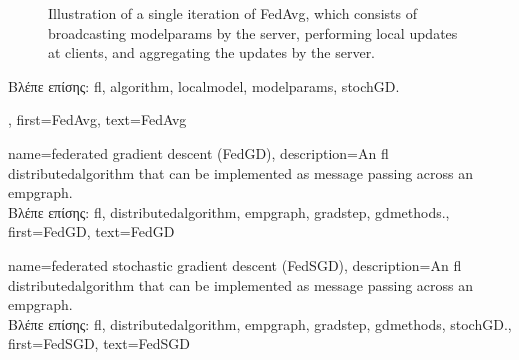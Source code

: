 {{\begin{figure}[H]
\begin{center}
			\end{center}
			\caption{Illustration of a single iteration of FedAvg, which consists of broadcasting \glspl{modelparam} by the 
			server, performing local updates at clients, and aggregating the updates by the server. 
			\label{fig_single_iteration_fedavg_dict}} 
		\end{figure} 
		\foreignlanguage{greek}{Βλέπε επίσης:} \gls{fl}, \gls{algorithm}, \gls{localmodel}, \glspl{modelparam}, \gls{stochGD}.},
	first={FedAvg},
	text={Fed\-Avg}
} 

{name={federated gradient descent (FedGD)},
	description={An \gls{fl} \gls{distributedalgorithm} that 
		can be implemented as message passing across an \gls{empgraph}. \\ 
		\foreignlanguage{greek}{Βλέπε επίσης:} \gls{fl}, \gls{distributedalgorithm}, \gls{empgraph}, \gls{gradstep}, \gls{gdmethods}.},
	first={FedGD},
	text={FedGD}
} 

{name={federated stochastic gradient descent (FedSGD)},
	description={An \gls{fl} \gls{distributedalgorithm} that 
		can be implemented as message passing across an \gls{empgraph}. \\ 
		\foreignlanguage{greek}{Βλέπε επίσης:} \gls{fl}, \gls{distributedalgorithm}, \gls{empgraph}, \gls{gradstep}, \gls{gdmethods}, \gls{stochGD}.},
	first={FedSGD},
	text={FedSGD}
} 

